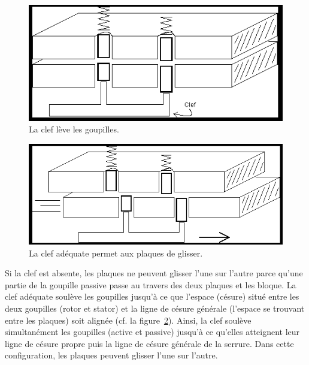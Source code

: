 \documentclass[a4paper,french,11pt,twoside]{report}
\begin{document}
\begin{figure}[h]
  \begin{center}
    \includegraphics[width=16cm]{images/image3_serrure}
    \caption{La clef lève les goupilles.\label{clef_leve_goupilles}}
  \end{center}
\end{figure}

\begin{figure}[h]
  \begin{center}
    \includegraphics[width=16cm]{images/image5}
    \caption{La clef adéquate permet aux plaques de glisser.\label{clef_plaques}}
  \end{center}
\end{figure}

Si la clef est absente, les plaques ne peuvent glisser l'une sur l'autre parce qu'une partie de la goupille passive passe au travers des deux plaques et les bloque. La clef adéquate soulève les goupilles jusqu'à ce que l'espace (césure) situé entre les deux goupilles (rotor et stator) et la ligne de césure générale (l'espace se trouvant entre les plaques) soit alignée (cf. la figure~\ref{clef_plaques}). Ainsi, la clef soulève simultanément les goupilles (active et passive) jusqu'à ce qu'elles atteignent leur ligne de césure propre puis la ligne de césure générale de la serrure. Dans cette configuration, les plaques peuvent glisser l'une sur l'autre.
\end{document}

